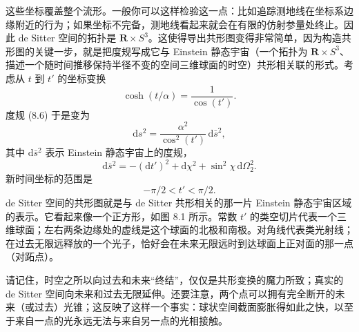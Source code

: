 这些坐标覆盖整个流形。一般你可以这样检验这一点：比如追踪测地线在坐标系边缘附近的行为；如果坐标不完备，测地线看起来就会在有限的仿射参量处终止。因此 de Sitter 空间的拓扑是 $\mathbf{R}\times S^3$。这使得导出共形图变得非常简单，因为构造共形图的关键一步，就是把度规写成它与 Einstein 静态宇宙（一个拓扑为 $\mathbf{R}\times S^3$、描述一个随时间推移保持半径不变的空间三维球面的时空）共形相关联的形式。考虑从 $t$ 到 $t'$ 的坐标变换
\begin{equation*}
\cosh(t/\alpha) = \frac{1}{\cos(t')}.
\tag{8.7}
\end{equation*}
度规 (8.6) 于是变为
\begin{equation*}
\mathrm{d}s^2 = \frac{\alpha^2}{\cos^2(t')}\,\mathrm{d}\bar{s}^2,
\tag{8.8}
\end{equation*}
其中 $\mathrm{d}\bar{s}^2$ 表示 Einstein 静态宇宙上的度规，
\begin{equation*}
\mathrm{d}\bar{s}^2 = -(\mathrm{d}t')^2 + \mathrm{d}\chi^2 + \sin^2\chi\,\mathrm{d}\Omega_2^2.
\tag{8.9}
\end{equation*}
新时间坐标的范围是
\begin{equation*}
-\pi/2 < t' < \pi/2.
\tag{8.10}
\end{equation*}
de Sitter 空间的共形图就是与 de Sitter 共形相关的那一片 Einstein 静态宇宙区域的表示。它看起来像一个正方形，如图 8.1 所示。常数 $t'$ 的类空切片代表一个三维球面；左右两条边缘处的虚线是这个球面的北极和南极。对角线代表类光射线；在过去无限远释放的一个光子，恰好会在未来无限远时到达球面上正对面的那一点（对跖点）。


请记住，时空之所以向过去和未来“终结”，仅仅是共形变换的魔力所致；真实的 de Sitter 空间向未来和过去无限延伸。还要注意，两个点可以拥有完全断开的未来（或过去）光锥；这反映了这样一个事实：球状空间截面膨胀得如此之快，以至于来自一点的光永远无法与来自另一点的光相接触。

